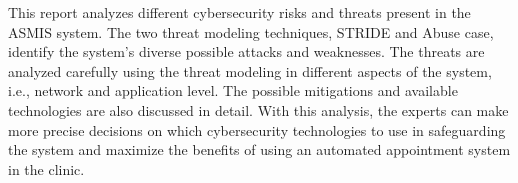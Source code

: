 This report analyzes different cybersecurity risks and threats present in the ASMIS system. The two threat modeling techniques, STRIDE and Abuse case, identify the system's diverse possible attacks and weaknesses. The threats are analyzed carefully using the threat modeling in different aspects of the system, i.e., network and application level. The possible mitigations and available technologies are also discussed in detail. With this analysis, the experts can make more precise decisions on which cybersecurity technologies to use in safeguarding the system and maximize the benefits of using an automated appointment system in the clinic.